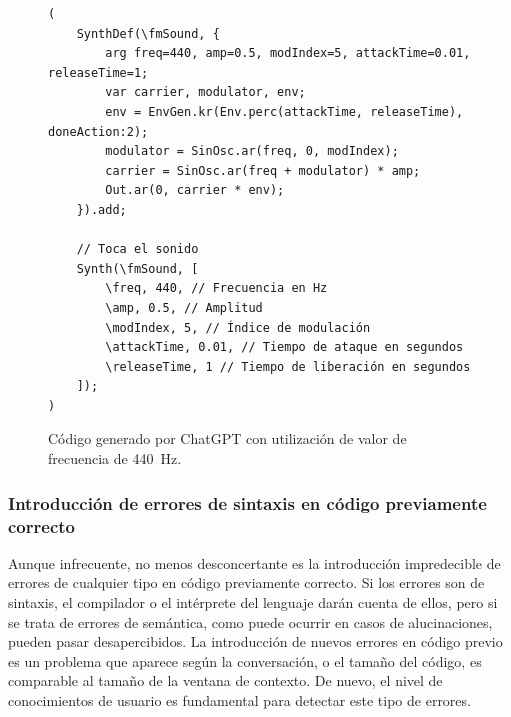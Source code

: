 \begin{figure}[H]
    \caption[Código generado por ChatGPT con utilización de valor de frecuencia de \SI{440}{\hertz}]{Código generado por ChatGPT con utilización de valor de frecuencia de \SI{440}{\hertz}.}
    \centering
    \begin{lstlisting}[style=SuperCollider-IDE, basicstyle=\footnotesize\ttfamily, numbers=none]
(
    SynthDef(\fmSound, {
        arg freq=440, amp=0.5, modIndex=5, attackTime=0.01, releaseTime=1;
        var carrier, modulator, env;
        env = EnvGen.kr(Env.perc(attackTime, releaseTime), doneAction:2);
        modulator = SinOsc.ar(freq, 0, modIndex);
        carrier = SinOsc.ar(freq + modulator) * amp;
        Out.ar(0, carrier * env);
    }).add;
    
    // Toca el sonido
    Synth(\fmSound, [
        \freq, 440, // Frecuencia en Hz
        \amp, 0.5, // Amplitud
        \modIndex, 5, // Índice de modulación
        \attackTime, 0.01, // Tiempo de ataque en segundos
        \releaseTime, 1 // Tiempo de liberación en segundos
    ]);
) 
    \end{lstlisting}
    \source{\propio}
    \label{fig:ChatGPT_valores_por_defecto}
\end{figure}



\subsubsection{Introducción de errores de sintaxis en código previamente correcto}
Aunque infrecuente, no menos desconcertante es la introducción impredecible de errores de cualquier tipo en código previamente correcto. Si los errores son de sintaxis, el compilador o el intérprete del lenguaje darán cuenta de ellos, pero si se trata de errores de semántica, como puede ocurrir en casos de alucinaciones, pueden pasar desapercibidos. La introducción de nuevos errores en código previo es un problema que aparece según la conversación, o el tamaño del código, es comparable al tamaño de la ventana de contexto. De nuevo, el nivel de conocimientos de usuario es fundamental para detectar este tipo de errores.


